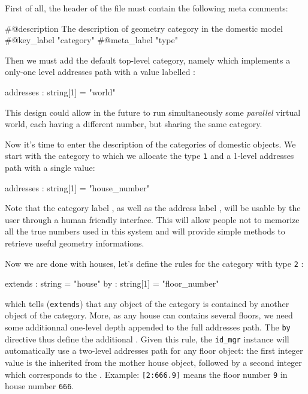 \pn First of all, the header of the file must contain the following
meta comments:

\begin{ShellVerbatim}
#@description The description of geometry category in the domestic model
#@key_label   "category"
#@meta_label  "type"
\end{ShellVerbatim}

Then we must add the default top-level category, namely  which
implements a only-one level addresses path with a value labelled  :
\begin{ShellVerbatim}
[category="world" type="0"]
addresses : string[1] = "world"
\end{ShellVerbatim}

This design could allow in the future to run simultaneously
some \emph{parallel} virtual world, each having a different 
 number, but sharing the same  category.

Now it's time to enter the description of the categories
of domestic objects.
We start with the  category to which we allocate
the type \texttt{1} and a 1-level addresses path with a single 
 value:
\begin{ShellVerbatim}
[category="house" type="1"]
addresses : string[1] = "house_number"
\end{ShellVerbatim}
Note that the category label , as well as
the address label , will be usable by the user through
a human friendly interface. This will allow people not to memorize
all the true numbers used in this system and will provide simple methods
to retrieve useful geometry informations.

Now we are done with houses, let's define the rules for the  category
with type \texttt{2} :
\begin{ShellVerbatim}
[category="floor" type="2"]
extends : string    = "house"
by      : string[1] = "floor_number"
\end{ShellVerbatim}
which tells (\texttt{extends}) that any object of the  category 
is contained by another object of the  category.
More, as any house can contains several floors, we need some additionnal 
one-level depth appended to the full addresses path. The \texttt{by}
directive thus define the additional .
Given this rule, the \texttt{id\_mgr} instance will
automatically use a two-level addresses path for any floor object:
the first integer value is the    inherited from
the mother house object, followed by
a second integer which corresponds to the .
Example: \verb+[2:666.9]+ means the floor number \texttt{9} 
in house number \texttt{666}.


